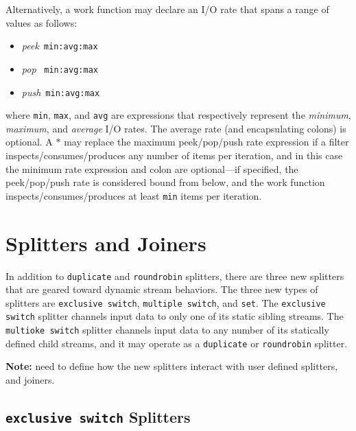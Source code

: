 \documentclass{tr}
\begin{document}
Alternatively, a  work function may declare  an I/O rate  that spans a
range of values as follows:
\begin{itemize}
\item {\it peek}~\texttt{min:avg:max}
\item {\it pop }~\texttt{min:avg:max}
\item {\it push}~\texttt{min:avg:max}
\end{itemize}
where  \texttt{min}, \texttt{max},  and  \texttt{avg} are  expressions
that respectively represent the {\it minimum}, {\it maximum}, and {\it
average} I/O  rates.  The average  rate (and encapsulating  colons) is
optional.  A $*$ may replace the maximum peek/pop/push rate expression
if  a  filter  inspects/consumes/produces  any  number  of  items  per
iteration, and in this case  the minimum rate expression and colon are
optional---if  specified, the peek/pop/push  rate is  considered bound
from below, and the  work function inspects/consumes/produces at least
\texttt{min} items per iteration.


\section{Splitters and Joiners}

In addition  to \texttt{duplicate} and  \texttt{roundrobin} splitters,
there are  three new splitters  that are geared toward  dynamic stream
behaviors.   The three  new types  of splitters  are \texttt{exclusive
switch},    \texttt{multiple   switch},    and    \texttt{set}.    The
\texttt{exclusive switch} splitter channels  input data to only one of
its  static  sibling streams.  The  \texttt{multioke switch}  splitter
channels  input data  to any  number of  its statically  defined child
streams,   and   it   may   operate   as   a   \texttt{duplicate}   or
\texttt{roundrobin} splitter.

{\bf Note:}  need to define how  the new splitters  interact with user
defined splitters, and joiners.


\subsection {\texttt{exclusive switch} Splitters}
\end{document}
